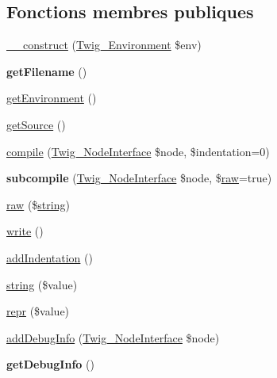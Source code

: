 \subsection*{Fonctions membres publiques}
\begin{DoxyCompactItemize}
\item 
\hyperlink{class_twig___compiler_a4f8326243132c1450a81e0a817aa1be7}{\+\_\+\+\_\+construct} (\hyperlink{class_twig___environment}{Twig\+\_\+\+Environment} \$env)
\item 
{\bfseries get\+Filename} ()\hypertarget{class_twig___compiler_a2982abe8d7b767602a1485dfb4cf653d}{}\label{class_twig___compiler_a2982abe8d7b767602a1485dfb4cf653d}

\item 
\hyperlink{class_twig___compiler_a1a945689f9a90f9029d671ec32262d37}{get\+Environment} ()
\item 
\hyperlink{class_twig___compiler_a42fdd8313c99d9c5f80219c1e192b93a}{get\+Source} ()
\item 
\hyperlink{class_twig___compiler_af1dcaa90386feaeb7eb51d16a8951999}{compile} (\hyperlink{interface_twig___node_interface}{Twig\+\_\+\+Node\+Interface} \$node, \$indentation=0)
\item 
{\bfseries subcompile} (\hyperlink{interface_twig___node_interface}{Twig\+\_\+\+Node\+Interface} \$node, \$\hyperlink{class_twig___compiler_ad067731c51a63ace079316e8252fff4b}{raw}=true)\hypertarget{class_twig___compiler_a8e6aa981f4b2ceaf4fc20b922acebbd6}{}\label{class_twig___compiler_a8e6aa981f4b2ceaf4fc20b922acebbd6}

\item 
\hyperlink{class_twig___compiler_ad067731c51a63ace079316e8252fff4b}{raw} (\$\hyperlink{class_twig___compiler_af168408db12bfe7bb7e326a765fa085d}{string})
\item 
\hyperlink{class_twig___compiler_aa245791a86f0178986f84c9357339aab}{write} ()
\item 
\hyperlink{class_twig___compiler_a02533749d6f3f827202ed66f2d86e459}{add\+Indentation} ()
\item 
\hyperlink{class_twig___compiler_af168408db12bfe7bb7e326a765fa085d}{string} (\$value)
\item 
\hyperlink{class_twig___compiler_a6f9785d88c108c5eef3d6f946c620e66}{repr} (\$value)
\item 
\hyperlink{class_twig___compiler_a26cbbd1f0bd9186c953c5fde5180ff22}{add\+Debug\+Info} (\hyperlink{interface_twig___node_interface}{Twig\+\_\+\+Node\+Interface} \$node)
\item 
{\bfseries get\+Debug\+Info} ()\hypertarget{class_twig___compiler_abd0ecb0136f4228db2bd963bfc1e20d7}{}\label{class_twig___compiler_abd0ecb0136f4228db2bd963bfc1e20d7}


\end{DoxyCompactItemize}
